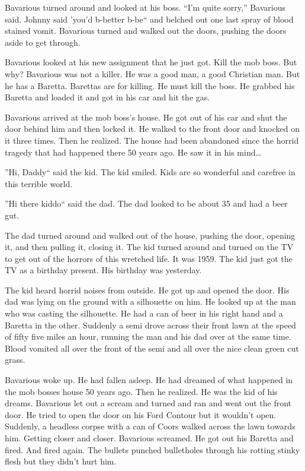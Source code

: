 Bavarious turned around and looked at his boss. ``I'm quite sorry,''
Bavarious said. Johnny said 'you'd b-better b-be`` and belched out
one last spray of blood stained vomit. Bavarious turned and walked
out the doors, pushing the doors aside to get through.



Bavarious looked at his new assignment that he just got. Kill the
mob boss. But why? Bavarious was not a killer. He was a good man, a
good Christian man. But he has a Baretta. Barettas are for killing.
He must kill the boss. He grabbed his Baretta and loaded it and got
in his car and hit the gas.



Bavarious arrived at the mob boss's house. He got out of his car
and shut the door behind him and then locked it. He walked to the
front door and knocked on it three times. Then he realized. The
house had been abandoned since the horrid tragedy that had happened
there 50 years ago. He saw it in his mind{\ldots}



''Hi, Daddy`` said the kid. The kid smiled. Kids are so wonderful and
carefree in this terrible world.

''Hi there kiddo`` said the dad. The dad looked to be about 35 and
had a beer gut.

The dad turned around and walked out of the house, pushing the
door, opening it, and then pulling it, closing it. The kid turned
around and turned on the TV to get out of the horrors of this
wretched life. It was 1959. The kid just got the TV as a birthday
present. His birthday was yesterday.



The kid heard horrid noises from outside. He got up and opened the
door. His dad was lying on the ground with a silhouette on him. He
looked up at the man who was casting the silhouette. He had a can
of beer in his right hand and a Baretta in the other. Suddenly a
semi drove across their front lawn at the speed of fifty five miles
an hour, running the man and his dad over at the same time. Blood
vomited all over the front of the semi and all over the nice clean
green cut grass.





Bavarious woke up. He had fallen asleep. He had dreamed of what
happened in the mob bosses house 50 years ago. Then he realized. He
was the kid of his dreams. Bavarious let out a scream and turned
and ran and went out the front door. He tried to open the door on
his Ford Contour but it wouldn't open. Suddenly, a headless corpse
with a can of Coors walked across the lawn towards him. Getting
closer and closer. Bavarious screamed. He got out his Baretta and
fired. And fired again. The bullets punched bulletholes through his
rotting stinky flesh but they didn't hurt him.




